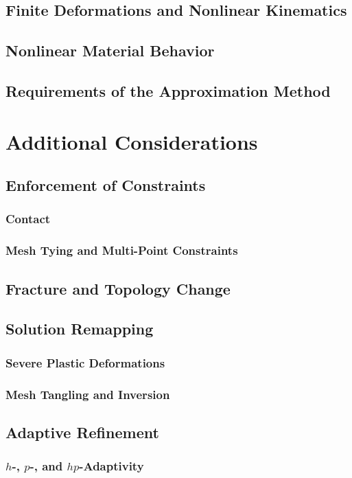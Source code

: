 \subsection{Finite Deformations and Nonlinear Kinematics}
\subsection{Nonlinear Material Behavior}
\subsection{Requirements of the Approximation Method}

\section{Additional Considerations}

\subsection{Enforcement of Constraints}
\subsubsection{Contact}
\subsubsection{Mesh Tying and Multi-Point Constraints}

\subsection{Fracture and Topology Change}

\subsection{Solution Remapping}
\subsubsection{Severe Plastic Deformations}
\subsubsection{Mesh Tangling and Inversion}

\subsection{Adaptive Refinement}
\subsubsection{$h$-, $p$-, and $hp$-Adaptivity}
